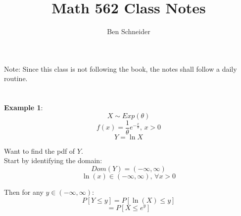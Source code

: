\documentclass[12pt]{article}
\begin{document}
\title{Math 562 Class Notes}
\author{Ben Schneider}
\date{}
\maketitle

${}$\\
Note: Since this class is not following the book, the notes shall follow a daily routine.\\\\
\\
{\bf Example 1}:
\\
$$ X \sim Exp(\theta)$$
$$f(x) = \frac{1}{\theta} e^{-\frac{x}{\theta}}\text{,    }x > 0$$
$$Y = \ln{X}$$

Want to find the pdf of $Y$.\\

Start by identifying the domain:\\

$$Dom(Y) = (-\infty, \infty)$$
$$\ln{(x)} \in (-\infty, \infty)\text{, $\forall x > 0$}$$

Then for any $y \in (-\infty, \infty)$:\\
$$P[Y \leq y] = P[\ln{(X)} \leq y]$$
$$= P[X \leq e^{y}]$$
\end{document}
